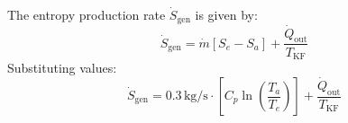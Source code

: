 The entropy production rate \( \dot{S}_{\text{gen}} \) is given by:  
\[
\dot{S}_{\text{gen}} = \dot{m} \left[ S_e - S_a \right] + \frac{\dot{Q}_{\text{out}}}{T_{\text{KF}}}
\]  
Substituting values:  
\[
\dot{S}_{\text{gen}} = 0.3 \, \text{kg/s} \cdot \left[ C_p \ln \left( \frac{T_a}{T_e} \right) \right] + \frac{\dot{Q}_{\text{out}}}{T_{\text{KF}}}
\]